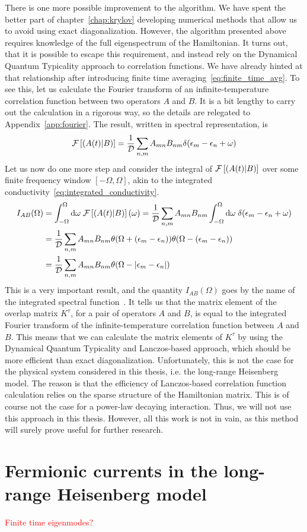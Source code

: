 \newpage
There is one more possible improvement to the algorithm. We have spent the better part of chapter~\ref{chap:krylov}
developing numerical methods that allow us to avoid using exact diagonalization. However, the algorithm presented
above requires knowledge of the full eigenspectrum of the Hamiltonian. It turns out, that it is possible
to escape this requirement, and instead rely on the Dynamical Quantum Typicality approach to correlation functions.
We have already hinted at that relationship after introducing finite time averaging~\eqref{eq:finite_time_avg}.
To see this, let us calculate the Fourier transform of an infinite-temperature correlation function between
two operators \(A\) and \(B\). It is a bit lengthy to carry out the calculation in a rigorous way, so the
details are relegated to Appendix~\ref{app:fourier}. The result, written in spectral representation, is
\begin{equation}  
  \mathcal{F}\left[\left(A(t) \middle| B\right)\right] = \frac{1}{\mathcal{D}}\sum_{n,m} A_{mn} B_{nm} \delta(\epsilon_m-\epsilon_n+\omega)
  \label{eq:fourier_corr}
\end{equation}
Let us now do one more step and consider the integral of \(\mathcal{F}\left[\left(A(t) \middle| B\right)\right]\) over
some finite frequency window \([-\Omega, \Omega]\), akin to the integrated conductivity~\eqref{eq:integrated_conductivity}.
\begin{align}
    I_{AB}(\Omega) &= \int_{-\Omega}^{\Omega} \mathrm{d}\omega\; \mathcal{F}\left[\left(A(t) \middle| B\right)\right](\omega) =
    \frac{1}{\mathcal{D}}\sum_{n,m} A_{mn} B_{nm} \int_{-\Omega}^{\Omega} \mathrm{d}\omega \;
    \delta(\epsilon_m-\epsilon_n+\omega) \nonumber \\ &= \frac{1}{\mathcal{D}}\sum_{n,m} A_{mn} B_{nm}
    \theta(\Omega + (\epsilon_m-\epsilon_n))\theta(\Omega - (\epsilon_m-\epsilon_n)) \nonumber\\
    &= \frac{1}{\mathcal{D}}\sum_{n,m} A_{mn} B_{nm}\theta(\Omega - \abs{\epsilon_m-\epsilon_n})
    \label{eq:integrated_spectral}
\end{align}
This is a very important result, and the quantity \(I_{AB}(\Omega)\) goes by the name of
the integrated spectral function~\autocite{Vidmar2021}.
It tells us that the matrix element of the overlap matrix \(K^{\tau}\),
for a pair of operators \(A\) and \(B\), is equal to the integrated Fourier transform of the infinite-temperature
correlation function between \(A\) and \(B\). This means that we can calculate the matrix elements of \(K^{\tau}\)
by using the Dynamical Quantum Typicality and Lanczos-based approach, which should be more efficient than exact diagonalization.
Unfortunately, this is not the case for the  physical system considered in this thesis,
i.e. the long-range Heisenberg model. The reason is that the efficiency of Lanczos-based
correlation function calculation relies on the sparse structure of the Hamiltonian matrix.
This is of course not the case for a power-law decaying interaction. Thus, we will not use this approach
in this thesis. However, all this work is not in vain, as this method will surely prove useful
for further research.

\section{Fermionic currents in the long-range Heisenberg model \label{sec:fermionic_currents}}


\textcolor{red}{Finite time eigenmodes?}